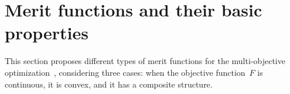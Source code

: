 \documentclass[../../main]{subfiles}
\begin{document}
\section{Merit functions and their basic properties} 
This section proposes different types of merit functions for the multi-objective optimization~, considering three cases: when the objective function~$F$ is continuous, it is convex, and it has a composite structure.






\end{document}
